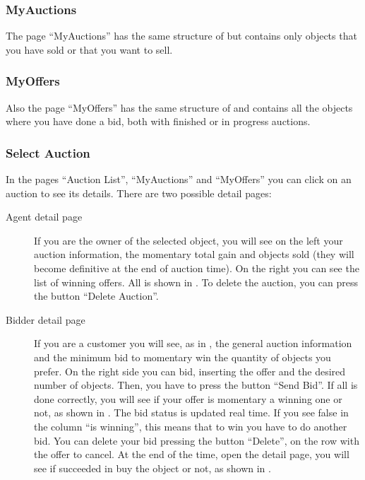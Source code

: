 
\subsubsection{MyAuctions}

The page ``MyAuctions'' has the same structure of  but
contains only objects that you have sold or that you want to sell.

\subsubsection{MyOffers}

Also the page ``MyOffers'' has the same structure of  and
contains all the objects where you have done a bid, both with finished or in
progress auctions.

\subsubsection{Select Auction}

In the pages ``Auction List'', ``MyAuctions'' and ``MyOffers'' you can click on
an auction to see its details. There are two possible detail pages:
\begin{description}
	\item[Agent detail page] If you are the owner of the selected object,
		you will see on the left your auction information, the momentary
		total gain and objects sold (they will become definitive at the
		end of auction time). On the right you can see the list of
		winning offers. All is shown in . To
		delete the auction, you can press the button ``Delete Auction''.
	\item[Bidder detail page] If you are a customer you will see, as in
		, the general auction information
		and the minimum bid to momentary win the quantity of objects you
		prefer.  On the right side you can bid, inserting the offer and
		the desired number of objects. Then, you have to press the
		button ``Send Bid''.  If all is done correctly, you will see if
		your offer is momentary a winning one or not, as shown in
		. The bid status is updated real time. If you
		see false in the column ``is winning'', this means that to win
		you have to do another bid. You can delete your bid pressing the
		button ``Delete'', on the row with the offer to cancel. At the
		end of the time, open the detail page, you will see if succeeded
		in buy the object or not, as shown in .
\end{description}

